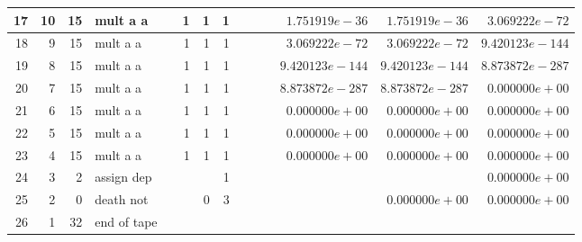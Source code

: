 \documentclass{article}
\begin{document}
\begin{tabular}{|r|r|r|l|r|r|r|r||r|r||r|r|r|r|}
17 & 10 & 15 & mult a a & & 1 & 1 & 1 & & & &$ 1.751919e-36 $&$ 1.751919e-36 $&$ 3.069222e-72 $\\ \hline 
18 & 9 & 15 & mult a a & & 1 & 1 & 1 & & & &$ 3.069222e-72 $&$ 3.069222e-72 $&$ 9.420123e-144 $\\ \hline 
19 & 8 & 15 & mult a a & & 1 & 1 & 1 & & & &$ 9.420123e-144 $&$ 9.420123e-144 $&$ 8.873872e-287 $\\ \hline 
20 & 7 & 15 & mult a a & & 1 & 1 & 1 & & & &$ 8.873872e-287 $&$ 8.873872e-287 $&$ 0.000000e+00 $\\ \hline 
21 & 6 & 15 & mult a a & & 1 & 1 & 1 & & & &$ 0.000000e+00 $&$ 0.000000e+00 $&$ 0.000000e+00 $\\ \hline 
22 & 5 & 15 & mult a a & & 1 & 1 & 1 & & & &$ 0.000000e+00 $&$ 0.000000e+00 $&$ 0.000000e+00 $\\ \hline 
23 & 4 & 15 & mult a a & & 1 & 1 & 1 & & & &$ 0.000000e+00 $&$ 0.000000e+00 $&$ 0.000000e+00 $\\ \hline 
24 & 3 & 2 & assign dep & & & & 1 & & & & & &$ 0.000000e+00 $\\ \hline 
25 & 2 & 0 & death not & & & 0 & 3 & & & & &$ 0.000000e+00 $&$ 0.000000e+00 $\\ \hline 
 26 & 1 & 32 & end of tape & & & & & & & & & &  \\ \hline 
\end{tabular}
\end{document}
